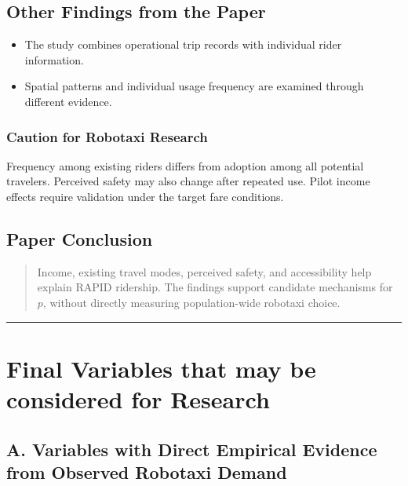 \documentclass[10pt,a4paper]{article}
\providecommand{\tightlist}{\setlength{\itemsep}{0pt}\setlength{\parskip}{0pt}}
\begin{document}
\subsection{Other Findings from the Paper}

\begin{itemize}
\tightlist
\item
  The study combines operational trip records
  with individual rider information.
\item
  Spatial patterns and individual usage frequency
  are examined through different evidence.
\end{itemize}

\subsubsection{Caution for Robotaxi Research}

Frequency among existing riders differs from adoption
among all potential travelers.
Perceived safety may also change after repeated use.
Pilot income effects require validation under the target fare conditions.

\subsection{Paper Conclusion}

\begin{quote}
Income, existing travel modes, perceived safety,
and accessibility help explain RAPID ridership.
The findings support candidate mechanisms for $p$,
without directly measuring population-wide robotaxi choice.
\end{quote}



\begin{center}\rule{0.5\linewidth}{0.5pt}\end{center}

\hypertarget{final-variables-that-may-be-considered-for-research}{%
\section{Final Variables that may be considered for Research}\label{final-variables-that-may-be-considered-for-research}}

\hypertarget{a.-variables-with-direct-empirical-evidence-from-observed-robotaxi-demand}{%
\subsection{A. Variables with Direct Empirical Evidence from Observed Robotaxi Demand}\label{a.-variables-with-direct-empirical-evidence-from-observed-robotaxi-demand}}
\end{document}
